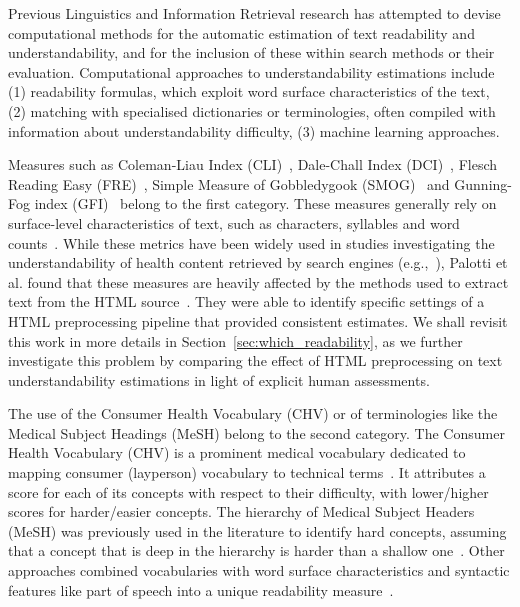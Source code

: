 Previous Linguistics and Information Retrieval research has attempted to devise computational methods for the automatic estimation of text readability and understandability, and for the inclusion of these within search methods or their evaluation. Computational approaches to understandability estimations include (1) readability formulas, which exploit word surface characteristics of the text, (2) matching with specialised dictionaries or terminologies, often compiled with information about understandability difficulty, (3) machine learning approaches.

Measures such as Coleman-Liau Index (CLI)~\cite{cli75}, Dale-Chall Index (DCI)~\cite{dale48}, Flesch Reading Easy (FRE)~\cite{flesch77}, Simple Measure of Gobbledygook (SMOG)~\cite{smog69} and Gunning-Fog index (GFI)~\cite{gunning52} belong to the first category. These measures generally rely on surface-level characteristics of text, such as characters, syllables and word counts~\cite{dubay04}.
While these metrics have been widely used in studies investigating the understandability of health content retrieved by search engines (e.g.,~\cite{becker2004study,graber99readability,fitzsimmons2010readability,wiener2013readability,patel13readability,atcherson14readability,meillier17readability}), Palotti et al. found that these measures are heavily affected by the methods used to extract text from the HTML source~\cite{palotti15}. They were able to identify specific settings of a HTML preprocessing pipeline that provided consistent  estimates. We shall revisit this work in more details in Section~\ref{sec:which_readability}, as we further investigate this problem by comparing the effect of HTML preprocessing on text understandability estimations in light of explicit human assessments. 


The use of the Consumer Health Vocabulary (CHV) or of terminologies like the Medical Subject Headings (MeSH) belong to the second category. The Consumer Health Vocabulary (CHV) is a prominent medical vocabulary dedicated to mapping consumer (layperson) vocabulary to technical terms~\cite{zeng06}. It attributes a score for each of its concepts with respect to their difficulty, with lower/higher scores for harder/easier concepts.
The hierarchy of Medical Subject Headers (MeSH) was previously used in the literature to identify hard concepts, assuming that a concept that is deep in the hierarchy is harder than a shallow one~\cite{yan11}. Other approaches combined vocabularies with word surface characteristics and syntactic features like part of speech into a unique readability measure~\cite{kim2007beyond}.


